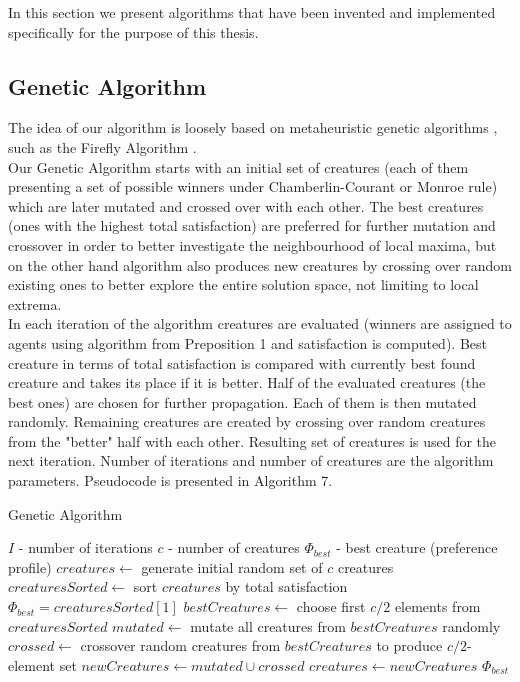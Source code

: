 In this section we present algorithms that have been invented and implemented specifically for the purpose of this thesis.

\subsection{Genetic Algorithm}

The idea of our algorithm is loosely based on metaheuristic genetic algorithms \cite{13}, such as the Firefly Algorithm \cite{13, 6}.
\\

Our Genetic Algorithm starts with an initial set of creatures (each of them presenting a set of possible winners under Chamberlin-Courant or Monroe rule) which are later mutated and crossed over with each other. The best creatures (ones with the highest total satisfaction) are preferred for further mutation and crossover in order to better investigate the neighbourhood of local maxima, but on the other hand algorithm also produces new creatures by crossing over random existing ones to better explore the entire solution space, not limiting to local extrema.
\\

In each iteration of the algorithm creatures are evaluated (winners are assigned to agents using algorithm from Preposition 1 and satisfaction is computed). Best creature in terms of total satisfaction is compared with currently best found creature and takes its place if it is better. Half of the evaluated creatures (the best ones) are chosen for further propagation. Each of them is then mutated randomly. Remaining creatures are created by crossing over random creatures from the "better" half with each other. Resulting set of creatures is used for the next iteration. Number of iterations and number of creatures are the algorithm parameters. Pseudocode is presented in Algorithm 7.

\begin{algorithm}
\caption{Genetic Algorithm}\label{euclid}
\begin{algorithmic}[1]
		\State $I$ - number of iterations
		\State $c$ - number of creatures
		\State $\Phi_{best}$ - best creature (preference profile)
		\State $creatures \gets$ generate initial random set of $c$ creatures
			\State $creaturesSorted \gets$ sort $creatures$ by total satisfaction
				\State $\Phi_{best} = creaturesSorted[1]$
			\EndIf
			\State $bestCreatures \gets$ choose first $c/2$ elements from $creaturesSorted$
			\State $mutated \gets$ mutate all creatures from $bestCreatures$ randomly
			\State $crossed \gets$ crossover random creatures from $bestCreatures$ to produce $c/2$-element set
			\State $newCreatures \gets mutated \cup crossed$
			\State $creatures \gets newCreatures$
		\EndFor
		\State \Return $\Phi_{best}$
	\EndProcedure
\end{algorithmic}
\end{algorithm}

